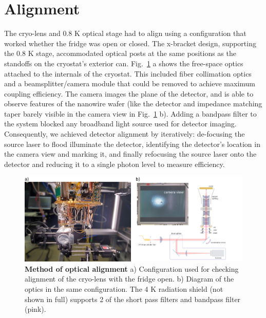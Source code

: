 \documentclass[11pt]{caltech_thesis} %
\begin{document}
\hypertarget{alignment}{%
\section{Alignment}\label{alignment}}

The cryo-lens and 0.8 K optical stage had to align using a configuration that worked whether the fridge was open or closed. The x-bracket design, supporting the 0.8 K stage, accommodated optical posts at the same positions as the standoffs on the cryostat's exterior can. Fig.~\ref{fig:optics_alignment} a shows the free-space optics attached to the internals of the cryostat. This included fiber collimation optics and a beamsplitter/camera module that could be removed to achieve maximum coupling efficiency. The camera images the plane of the detector, and is able to observe features of the nanowire wafer (like the detector and impedance matching taper barely visible in the camera view in Fig.~\ref{fig:optics_alignment} b). Adding a bandpass filter to the system blocked any broadband light source used for detector imaging. Consequently, we achieved detector alignment by iteratively: de-focusing the source laser to flood illuminate the detector, identifying the detector's location in the camera view and marking it, and finally refocusing the source laser onto the detector and reducing it to a single photon level to measure efficiency.

\hypertarget{fig:optics_alignment}{%
\begin{figure}
\centering
\includegraphics[width=1\textwidth,height=\textheight]{./chapter_02/figs/dcrmin_alignment_light.png}
\caption[{Method of optical alignment}]{\textbf{Method of optical alignment} a) Configuration used for checking alignment of the cryo-lens with the fridge open. b) Diagram of the optics in the same configuration. The 4 K radiation shield (not shown in full) supports 2 of the short pass filters and bandpass filter (pink).}
\label{fig:optics_alignment}
\end{figure}
}
\end{document}
